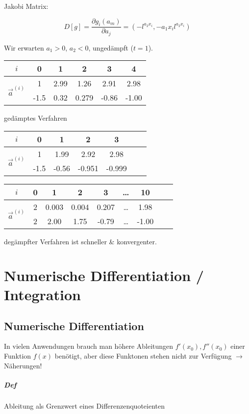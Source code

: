 \documentclass[a4paper,ngerman]{scrbook}
\newcommand{\un}[2]{\ensuremath{#1^{(#2)}}}%
\begin{document}
Jakobi Matrix:

\[
D[g] = \frac{\partial g_i(a_m)}{\partial a_j} = \left( -l^{a_2x_i}, -a_1x_il^{a_2x_i} \right)
\]

Wir erwarten $a_1 > 0$, $a_2 < 0$, ungedämpft ($t=1$).

\begin{tabular}{c|ccccc}
  $i$ & 0 & 1 & 2 & 3 & 4\\\hline
  \multirow{2}{*}{$\un{\vec{a}}{i}$} & 1 & 2.99 & 1.26 & 2.91 & 2.98\\
  & -1.5 & 0.32 & 0.279 & -0.86 & -1.00
\end{tabular}

gedämptes Verfahren

\begin{tabular}{c|cccccc}
  $i$ & 0 & 1 & 2 & 3\\\hline
  \multirow{2}{*}{$\un{\vec{a}}{i}$} & 1 & 1.99 & 2.92 & 2.98 \\
  & -1.5 & -0.56 & -0.951 & -0.999
\end{tabular}

\begin{tabular}{c|cccccccc}
  $i$ & 0 & 1 & 2 & 3 & \dots & 10\\\hline
  \multirow{2}{*}{$\un{\vec{a}}{i}$} & 2 & 0.003 & 0.004 & 0.207 & \dots & 1.98\\
  & 2 & 2.00 & 1.75 & -0.79 & \dots & -1.00
\end{tabular}

degämpfter Verfahren ist schneller \& konvergenter.

\chapter{Numerische Differentiation / Integration}
\label{chap:numdiff}

\section{Numerische Differentiation}

In vielen Anwendungen brauch man höhere Ableitungen $ f'(x_0), f''(x_0)$ einer Funktion $f(x)$ benötigt, aber diese Funktonen stehen nicht zur Verfügung $\to$ Näherungen!

\paragraph{Def}

Ableitung als Grenzwert eines Differenzenquoteienten
\end{document}
